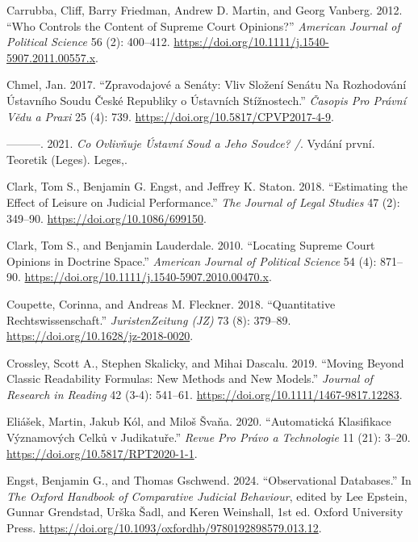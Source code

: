 \documentclass[
  11pt,
]{article}
\newlength{\cslhangindent}
\newenvironment{CSLReferences}[2] %
 {\begin{list}{}{%
  \setlength{\itemindent}{0pt}
  \setlength{\leftmargin}{0pt}
  \setlength{\parsep}{0pt}
  \ifodd #1
   \setlength{\leftmargin}{\cslhangindent}
   \setlength{\itemindent}{-1\cslhangindent}
  \fi
  \setlength{\itemsep}{#2\baselineskip}}}
 {\end{list}}
\begin{document}
\begin{CSLReferences}{1}{0}
Carrubba, Cliff, Barry Friedman, Andrew D. Martin, and Georg Vanberg. 2012. {``Who {Controls} the {Content} of {Supreme Court Opinions}?''} \emph{American Journal of Political Science} 56 (2): 400--412. \url{https://doi.org/10.1111/j.1540-5907.2011.00557.x}.

Chmel, Jan. 2017. {``Zpravodajové a Senáty: {Vliv} Složení Senátu Na Rozhodování {Ústavního} Soudu {České} Republiky o Ústavních Stížnostech.''} \emph{Časopis Pro Právní Vědu a Praxi} 25 (4): 739. \url{https://doi.org/10.5817/CPVP2017-4-9}.

---------. 2021. \emph{Co Ovlivňuje {Ústavní} Soud a Jeho Soudce? /}. Vydání první. Teoretik ({Leges}). Leges,.

Clark, Tom S., Benjamin G. Engst, and Jeffrey K. Staton. 2018. {``Estimating the {Effect} of {Leisure} on {Judicial Performance}.''} \emph{The Journal of Legal Studies} 47 (2): 349--90. \url{https://doi.org/10.1086/699150}.

Clark, Tom S., and Benjamin Lauderdale. 2010. {``Locating {Supreme Court Opinions} in {Doctrine Space}.''} \emph{American Journal of Political Science} 54 (4): 871--90. \url{https://doi.org/10.1111/j.1540-5907.2010.00470.x}.

Coupette, Corinna, and Andreas M. Fleckner. 2018. {``Quantitative {Rechtswissenschaft}.''} \emph{JuristenZeitung (JZ)} 73 (8): 379--89. \url{https://doi.org/10.1628/jz-2018-0020}.

Crossley, Scott A., Stephen Skalicky, and Mihai Dascalu. 2019. {``Moving Beyond Classic Readability Formulas: New Methods and New Models.''} \emph{Journal of Research in Reading} 42 (3-4): 541--61. \url{https://doi.org/10.1111/1467-9817.12283}.

Eliášek, Martin, Jakub Kól, and Miloš Švaňa. 2020. {``Automatická Klasifikace Významových Celků v Judikatuře.''} \emph{Revue Pro Právo a Technologie} 11 (21): 3--20. \url{https://doi.org/10.5817/RPT2020-1-1}.

Engst, Benjamin G., and Thomas Gschwend. 2024. {``Observational {Databases}.''} In \emph{The {Oxford Handbook} of {Comparative Judicial Behaviour}}, edited by Lee Epstein, Gunnar Grendstad, Urška Šadl, and Keren Weinshall, 1st ed. Oxford University Press. \url{https://doi.org/10.1093/oxfordhb/9780192898579.013.12}.


\end{CSLReferences}
\end{document}
